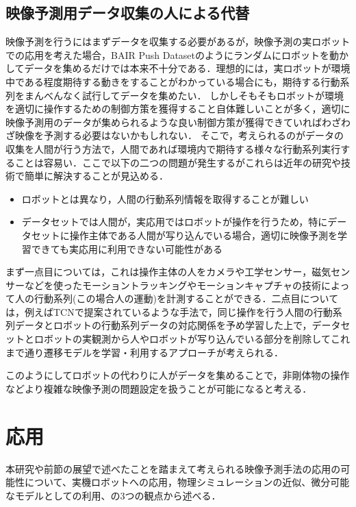 \subsection{映像予測用データ収集の人による代替}
映像予測を行うにはまずデータを収集する必要があるが，映像予測の実ロボットでの応用を考えた場合，BAIR Push Datasetのようにランダムにロボットを動かしてデータを集めるだけでは本来不十分である．理想的には，実ロボットが環境中である程度期待する動きをすることがわかっている場合にも，期待する行動系列をまんべんなく試行してデータを集めたい．
しかしそもそもロボットが環境を適切に操作するための制御方策を獲得すること自体難しいことが多く，適切に映像予測用のデータが集められるような良い制御方策が獲得できていればわざわざ映像を予測する必要はないかもしれない．
そこで，考えられるのがデータの収集を人間が行う方法で，人間であれば環境内で期待する様々な行動系列実行することは容易い．ここで以下の二つの問題が発生するがこれらは近年の研究や技術で簡単に解決することが見込める．
\begin{itemize}
    \item ロボットとは異なり，人間の行動系列情報を取得することが難しい
    \item データセットでは人間が，実応用ではロボットが操作を行うため，特にデータセットに操作主体である人間が写り込んでいる場合，適切に映像予測を学習できても実応用に利用できない可能性がある
\end{itemize}

まず一点目については，これは操作主体の人をカメラや工学センサー，磁気センサーなどを使ったモーショントラッキングやモーションキャプチャの技術によって人の行動系列(この場合人の運動)を計測することができる．二点目については，例えばTCN\cite{Sermanet_2018}で提案されているような手法で，同じ操作を行う人間の行動系列データとロボットの行動系列データの対応関係を予め学習した上で，データセットとロボットの実観測から人やロボットが写り込んでいる部分を削除してこれまで通り遷移モデルを学習・利用するアプローチが考えられる．

このようにしてロボットの代わりに人がデータを集めることで，非剛体物の操作などより複雑な映像予測の問題設定を扱うことが可能になると考える．

\section{応用}

本研究や前節の展望で述べたことを踏まえて考えられる映像予測手法の応用の可能性について、実機ロボットへの応用，物理シミュレーションの近似、微分可能なモデルとしての利用、の3つの観点から述べる．

